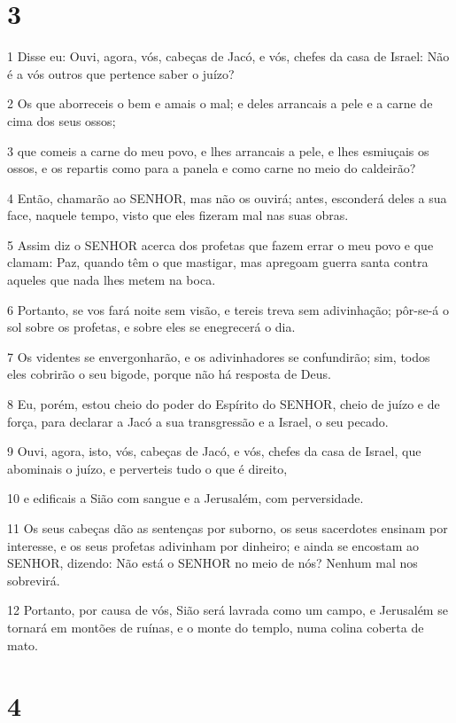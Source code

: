 \chapter{3}

\par 1 Disse eu: Ouvi, agora, vós, cabeças de Jacó, e vós, chefes da casa de Israel: Não é a vós outros que pertence saber o juízo?
\par 2 Os que aborreceis o bem e amais o mal; e deles arrancais a pele e a carne de cima dos seus ossos;
\par 3 que comeis a carne do meu povo, e lhes arrancais a pele, e lhes esmiuçais os ossos, e os repartis como para a panela e como carne no meio do caldeirão?
\par 4 Então, chamarão ao SENHOR, mas não os ouvirá; antes, esconderá deles a sua face, naquele tempo, visto que eles fizeram mal nas suas obras.
\par 5 Assim diz o SENHOR acerca dos profetas que fazem errar o meu povo e que clamam: Paz, quando têm o que mastigar, mas apregoam guerra santa contra aqueles que nada lhes metem na boca.
\par 6 Portanto, se vos fará noite sem visão, e tereis treva sem adivinhação; pôr-se-á o sol sobre os profetas, e sobre eles se enegrecerá o dia.
\par 7 Os videntes se envergonharão, e os adivinhadores se confundirão; sim, todos eles cobrirão o seu bigode, porque não há resposta de Deus.
\par 8 Eu, porém, estou cheio do poder do Espírito do SENHOR, cheio de juízo e de força, para declarar a Jacó a sua transgressão e a Israel, o seu pecado.
\par 9 Ouvi, agora, isto, vós, cabeças de Jacó, e vós, chefes da casa de Israel, que abominais o juízo, e perverteis tudo o que é direito,
\par 10 e edificais a Sião com sangue e a Jerusalém, com perversidade.
\par 11 Os seus cabeças dão as sentenças por suborno, os seus sacerdotes ensinam por interesse, e os seus profetas adivinham por dinheiro; e ainda se encostam ao SENHOR, dizendo: Não está o SENHOR no meio de nós? Nenhum mal nos sobrevirá.
\par 12 Portanto, por causa de vós, Sião será lavrada como um campo, e Jerusalém se tornará em montões de ruínas, e o monte do templo, numa colina coberta de mato.

\chapter{4}

